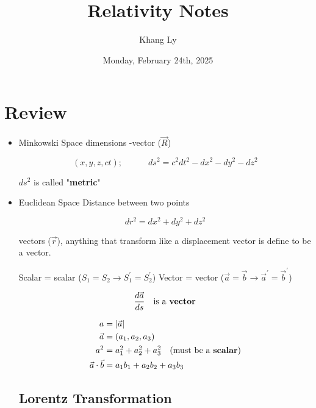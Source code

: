 \documentclass[12pt,a4paper]{article}
\title{\textbf{Relativity Notes}}
\author{Khang Ly}
\date{Monday, February 24th, 2025}
\begin{document}
	
	\maketitle
	\tableofcontents
	\newpage
	
	\section{Review}
	
	\begin{itemize}
		\item Minkowski Space
		 dimensions 
		-vector ($\vec{R}$)
		
		\begin{equation*}
			(x, y, z, ct);\hspace{3em}ds^2 = c^2dt^2 - dx^2 - dy^2 - dz^2
		\end{equation*}
		
		\subsubitem $ds^2$ is called "\textbf{metric}"
		
		\item Euclidean Space 
		\subitem Distance between two points 
		
		\begin{equation*}
			dr^2 = dx^2 + dy^2 + dz^2
		\end{equation*}
		
		 vectors (\textbf{$\vec{r}$}), anything that transform like a displacement vector is define to be a vector. 
		
		\subsubitem Scalar = scalar ($S_1 = S_2\rightarrow S_1^{\prime} = S_2^{\prime}$)
		\subsubitem Vector = vector ($\vec{a} = \vec{b}\rightarrow \vec{a}^{\prime} = \vec{b}^{\prime}$)
		
		$$\frac{d\vec{a}}{ds}\hspace{1em}\text{is a \textbf{vector}}$$		
		
		\begin{align*}
			a &= |\vec{a}|\\
			\vec{a} &= (a_1, a_2, a_3)\\
			a^2 &= a_1^2 + a_2^2 + a_3^2 \hspace{1em}(\text{must be a \textbf{scalar}})\\
			\vec{a}\cdot\vec{b} &= a_1b_1 + a_2b_2 + a_3b_3\\
		\end{align*}
		
		\subsection{Lorentz Transformation}
		

\end{itemize}
\end{document}
